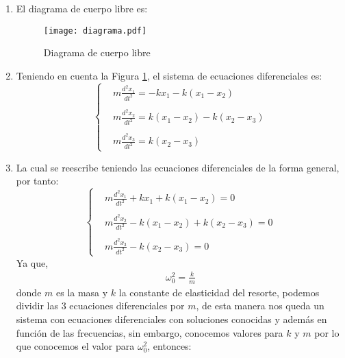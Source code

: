 \begin{multicols}{2}
\begin{enumerate}[leftmargin=15pt]
    \item El diagrama de cuerpo libre es:
    \begin{figure}[H]
        \begin{center}
        \texttt{[image: diagrama.pdf]}
        \caption{Diagrama de cuerpo libre}
        \label{diagrama}
        \end{center}
    \end{figure}
    \item Teniendo en cuenta la Figura \ref{diagrama}, el sistema de ecuaciones diferenciales es:
    \begin{equation*}
        \begin{cases}
            &m \displaystyle\frac{d^{2}x_{1}}{dt^{2}} = -kx_{1} - k(x_1 - x_2)\\
            \\
            &m \displaystyle\frac{d^{2}x_{2}}{dt^{2}} = k(x_1 - x_2) - k(x_2 - x_3)\\
            \\
            &m \displaystyle\frac{d^{2}x_{3}}{dt^{2}} = k(x_2 - x_3)
        \end{cases}
    \end{equation*}
    \item La cual se reescribe teniendo las ecuaciones diferenciales de la forma general, por tanto:
    \begin{equation*}
        \begin{cases}
            &m \displaystyle\frac{d^{2}x_{1}}{dt^{2}} + kx_{1} + k(x_1 - x_2) = 0\\
            \\
            &m \displaystyle\frac{d^{2}x_{2}}{dt^{2}} - k(x_1 - x_2) + k(x_2 - x_3) = 0\\
            \\
            &m \displaystyle\frac{d^{2}x_{3}}{dt^{2}} - k(x_2 - x_3) = 0
        \end{cases}
    \end{equation*}
    Ya que,
    \begin{align*}
        \omega^{2}_{0} = \frac{k}{m}
    \end{align*}
    donde $m$ es la masa y $k$ la constante de elasticidad del resorte, podemos dividir las 3 ecuaciones diferenciales por $m$, de esta manera nos queda un sistema con ecuaciones diferenciales con soluciones conocidas y además en función de las frecuencias, sin embargo, conocemos valores para $k$ y $m$ por lo que conocemos el valor para $\omega^{2}_{0}$, entonces:

\end{enumerate}
\end{multicols}
